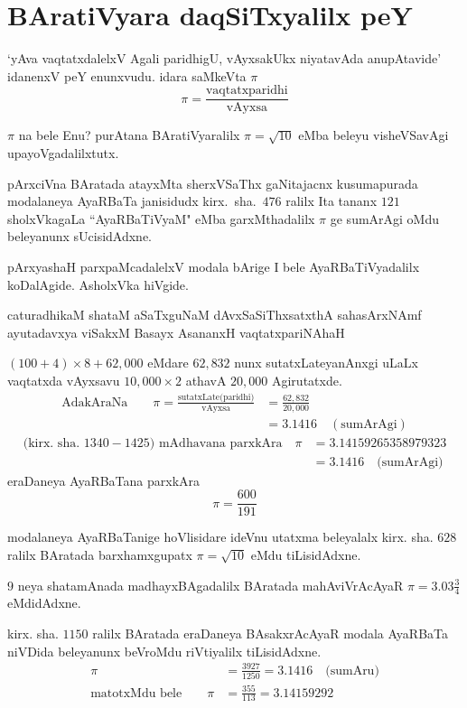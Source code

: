 \chapter{BAratiVyara daqSiTxyalilx peY}

`yAva vaqtatxdalelxV Agali paridhigU, vAyxsakUkx niyatavAda anupAtavide' idanenxV peY enunxvudu. idara saMkeVta $\pi$
$$
\pi = \frac{\text{vaqtatxparidhi}}{\text{vAyxsa}}
$$

$\pi$ na bele Enu? purAtana BAratiVyaralilx $\pi = \sqrt{10}$ eMba beleyu visheVSa\-vAgi upayoVgadalilxtutx.

pArxciVna BAratada atayxMta sherxVSaThx gaNitajacnx kusumapurada modalaneya AyaRBaTa janisidudx kirx.~sha.\ $476$ ralilx Ita tananx $121$ sholxVkagaLa ``AyaRBaTiVyaM" eMba garxMthadalilx $\pi$ ge sumArAgi oMdu beleyanunx sUcisidAdxne.

pArxyashaH parxpaMcadalelxV modala bArige I bele AyaRBaTiVyadalilx koDa\-lAgide. AsholxVka hiVgide.

\begin{center}
caturadhikaM shataM aSaTxguNaM dAvxSaSiThxsatxthA sahasArxNAmf\\
ayutadavxya viSakxM Basayx AsananxH vaqtatxpariNAhaH
\end{center} 
 
$(100+4)\times 8 + 62,000$ eMdare $62,832$ nunx sutatxLateyanAnxgi uLaLx vaqtatxda vAyxsavu $10,000\times 2$ athavA $20,000$ Agirutatxde.
\begin{align*}
\text{AdakAraNa}\qquad \pi = \frac{\text{sutatxLate(paridhi)}}{\text{vAyxsa}} &= \frac{62,832}{20,000}\\
&= 3.1416\quad(\text{sumArAgi}) 
\end{align*} 
\begin{align*}
\text{(kirx.~sha.\ $1340-1425$) mAdhavana parxkAra} \quad\pi &= 3.14159265358979323\\
&=3.1416 \quad\text{(sumArAgi)}  
\end{align*}
eraDaneya AyaRBaTana parxkAra
$$
\pi = \frac{600}{191}
$$

modalaneya AyaRBaTanige hoVlisidare ideVnu utatxma beleyalalx kirx. sha. $628$ ralilx BAratada barxhamxgupatx $\pi = \sqrt{10}$ eMdu tiLisidAdxne.

$9$ neya shatamAnada madhayxBAgadalilx BAratada mahAviVrAcAyaR $\pi = 3.03\frac{3}{4}$ eMdidAdxne.

kirx. sha. $1150$ ralilx BAratada eraDaneya BAsakxrAcAyaR modala AyaRBaTa niVDida beleyanunx beVroMdu riVtiyalilx tiLisidAdxne.
\begin{align*}
\pi &= \frac{3927}{1250} = 3.1416 \quad\text{(sumAru)}\\
\text{matotxMdu bele}\qquad \pi &= \frac{355}{113} = 3.14159292
\end{align*}


